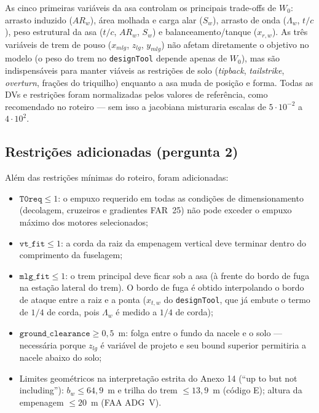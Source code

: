 \documentclass[11pt,a4paper]{article}
\begin{document}
As cinco primeiras variáveis da asa controlam os principais trade-offs de
$W_0$: arrasto induzido ($AR_w$), área molhada e carga alar ($S_w$), arrasto
de onda ($\Lambda_w$, $t/c$), peso estrutural da asa ($t/c$, $AR_w$, $S_w$) e
balanceamento/tanque ($x_{r,w}$). As três variáveis de trem de pouso
($x_{mlg}$, $z_{lg}$, $y_{mlg}$) não afetam diretamente o objetivo no modelo
(o peso do trem no \texttt{designTool} depende apenas de $W_0$), mas são
indispensáveis para manter viáveis as restrições de solo
(\emph{tipback}, \emph{tailstrike}, \emph{overturn}, frações do triquilho)
enquanto a asa muda de posição e forma. Todas as DVs e restrições foram
normalizadas pelos valores de referência, como recomendado no roteiro ---
sem isso a jacobiana misturaria escalas de $5\cdot10^{-2}$ a $4\cdot10^{2}$.

\subsection{Restrições adicionadas (pergunta 2)}

Além das restrições mínimas do roteiro, foram adicionadas:
\begin{itemize}
\item $\texttt{T0req} \le 1$: o empuxo requerido em todas as condições de
      dimensionamento (decolagem, cruzeiros e gradientes FAR~25) não pode
      exceder o empuxo máximo dos motores selecionados;
\item $\texttt{vt\_fit} \le 1$: a corda da raiz da empenagem vertical deve
      terminar dentro do comprimento da fuselagem;
\item $\texttt{mlg\_fit} \le 1$: o trem principal deve ficar sob a asa
      (à frente do bordo de fuga na estação lateral do trem). O bordo de fuga
      é obtido interpolando o bordo de ataque entre a raiz e a ponta
      ($x_{t,w}$ do \texttt{designTool}, que já embute o termo de $1/4$ de
      corda, pois $\Lambda_w$ é medido a $1/4$ de corda);
\item $\texttt{ground\_clearance} \ge 0{,}5$~m: folga entre o fundo da nacele
      e o solo --- necessária porque $z_{lg}$ é variável de projeto e seu
      bound superior permitiria a nacele abaixo do solo;
\item Limites geométricos na interpretação estrita do Anexo 14
      (``up to but not including''): $b_w \le 64{,}9$~m e trilha do trem
      $\le 13{,}9$~m (código E); altura da empenagem $\le 20$~m (FAA ADG~V).
\end{itemize}
\end{document}
